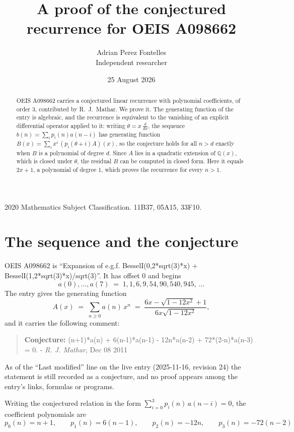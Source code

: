 \documentclass[11pt,a4paper]{article}
\title{A proof of the conjectured recurrence for OEIS A098662}
\author{Adrian Perez Fontelles\\ \small Independent researcher}
\date{25 August 2026}
\theoremstyle{plain}
\theoremstyle{definition}
\begin{document}
\maketitle

\begin{abstract}
OEIS A098662 carries a conjectured linear recurrence with polynomial coefficients, of
order 3, contributed by R.~J.~Mathar. We prove it. The generating function of the
entry is algebraic, and the recurrence is equivalent to the vanishing of an explicit
differential operator applied to it: writing $\theta=x\,\frac{d}{dx}$, the sequence
$b(n)=\sum_{i}p_{i}(n)a(n-i)$ has generating function
$B(x)=\sum_{i}x^{i}\,(p_{i}(\theta+i)A)(x)$, so the conjecture holds for all $n>d$ exactly
when $B$ is a polynomial of degree $d$. Since $A$ lies in a quadratic extension of
$\mathbb{Q}(x)$, which is closed under $\theta$, the residual $B$ can be computed in
closed form. Here it equals $2 x + 1$, a polynomial of degree $1$, which proves
the recurrence for every $n>1$.
\end{abstract}

\noindent\small 2020 Mathematics Subject Classification. 11B37, 05A15, 33F10.\normalsize

\section{The sequence and the conjecture}

OEIS A098662 is ``Expansion of e.g.f. BesselI(0,2*sqrt(3)*x) + BesselI(1,2*sqrt(3)*x)/sqrt(3)''. It has offset $0$ and begins
\[
a(0),\dots,a(7)\;=\;1, 1, 6, 9, 54, 90, 540, 945,\ \dots
\]
The entry gives the generating function
\begin{equation}\label{eq:gf}
A(x)\;=\;\sum_{n\ge 0} a(n)\,x^{n}\;=\;\frac{6 x - \sqrt{1 - 12 x^{2}} + 1}{6 x \sqrt{1 - 12 x^{2}}} ,
\end{equation}
and it carries the following comment:
\begin{quote}\small
\textbf{Conjecture:} (n+1)*a(n) + 6(n-1)*a(n-1) - 12n*a(n-2) + 72*(2-n)*a(n-3) = 0. - \emph{R. J. Mathar}, Dec 08 2011
\end{quote}
As of the ``Last modified'' line on the live entry (2025-11-16, revision 24) the
statement is still recorded as a conjecture, and no proof appears among the entry's links,
formulas or programs.

Writing the conjectured relation in the form $\sum_{i=0}^{3}p_{i}(n)\,a(n-i)=0$,
the coefficient polynomials are
\[
p_{0}(n)=n + 1,\qquad p_{1}(n)=6 \left(n - 1\right),\qquad p_{2}(n)=- 12 n,\qquad p_{3}(n)=- 72 \left(n - 2\right)
\]
\end{document}
